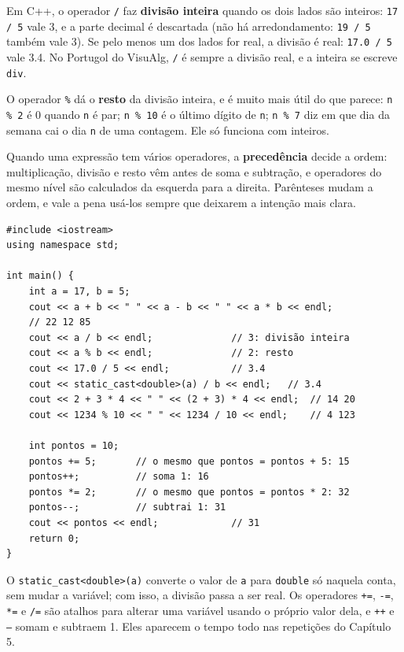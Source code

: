 Em C++, o operador \texttt{/} faz \textbf{divisão inteira} quando os dois lados são inteiros: \texttt{17 / 5} vale 3, e a parte decimal é descartada (não há arredondamento: \texttt{19 / 5} também vale 3). Se pelo menos um dos lados for real, a divisão é real: \texttt{17.0 / 5} vale 3.4. No Portugol do VisuAlg, \texttt{/} é sempre a divisão real, e a inteira se escreve \texttt{div}.

O operador \texttt{\%} dá o \textbf{resto} da divisão inteira, e é muito mais útil do que parece: \texttt{n \% 2} é 0 quando \texttt{n} é par; \texttt{n \% 10} é o último dígito de \texttt{n}; \texttt{n \% 7} diz em que dia da semana cai o dia \texttt{n} de uma contagem. Ele só funciona com inteiros.

Quando uma expressão tem vários operadores, a \textbf{precedência} decide a ordem: multiplicação, divisão e resto vêm antes de soma e subtração, e operadores do mesmo nível são calculados da esquerda para a direita. Parênteses mudam a ordem, e vale a pena usá-los sempre que deixarem a intenção mais clara.

\begin{codigo}
\begin{Verbatim}[breaklines=true, breaksymbolleft={}, fontsize=\footnotesize]
#include <iostream>
using namespace std;

int main() {
    int a = 17, b = 5;
    cout << a + b << " " << a - b << " " << a * b << endl;
    // 22 12 85
    cout << a / b << endl;              // 3: divisão inteira
    cout << a % b << endl;              // 2: resto
    cout << 17.0 / 5 << endl;           // 3.4
    cout << static_cast<double>(a) / b << endl;   // 3.4
    cout << 2 + 3 * 4 << " " << (2 + 3) * 4 << endl;  // 14 20
    cout << 1234 % 10 << " " << 1234 / 10 << endl;    // 4 123

    int pontos = 10;
    pontos += 5;       // o mesmo que pontos = pontos + 5: 15
    pontos++;          // soma 1: 16
    pontos *= 2;       // o mesmo que pontos = pontos * 2: 32
    pontos--;          // subtrai 1: 31
    cout << pontos << endl;             // 31
    return 0;
}
\end{Verbatim}
\end{codigo}

O \texttt{static\_cast<double>(a)} converte o valor de \texttt{a} para \texttt{double} só naquela conta, sem mudar a variável; com isso, a divisão passa a ser real. Os operadores \texttt{+=}, \texttt{-=}, \texttt{*=} e \texttt{/=} são atalhos para alterar uma variável usando o próprio valor dela, e \texttt{++} e \texttt{--} somam e subtraem 1. Eles aparecem o tempo todo nas repetições do Capítulo 5.

